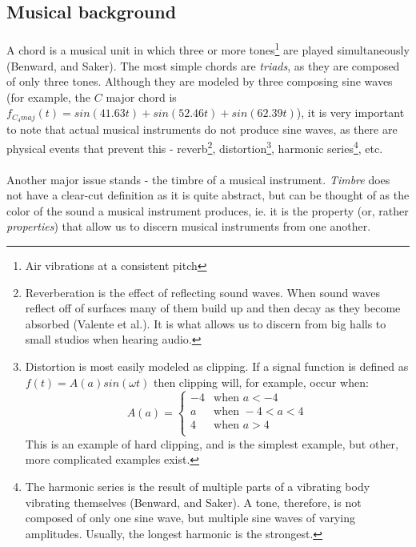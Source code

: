 \documentclass{article}
\begin{document}
\subsection{Musical background}

\paragraph*{}
A chord is a musical unit in which three or more tones\footnote{Air vibrations
at a consistent pitch} are played simultaneously (Benward, and Saker). The most
simple chords are \textit{triads}, as they are composed of only three tones.
Although they are modeled by three composing sine waves (for example, the $C$
major chord is $f_{C_4maj} (t) = sin(41.63t) + sin(52.46t) + sin(62.39t)$), it
is very important to note that actual musical instruments do not produce sine
waves, as there are physical events that prevent this -
reverb\footnote{Reverberation is the effect of reflecting sound waves. When
	sound waves reflect off of surfaces many of them build up and then decay as
	they become absorbed (Valente et al.). It is what allows us to discern from
	big halls to small studios when hearing audio.},
	distortion\footnote{Distortion is most easily modeled as clipping. If a
		signal function is defined as $f(t) = A(a) sin(\omega t)$ then clipping
		will, for example, occur when:
$$A(a) = 
\begin{cases}
	-4	& \text{when }a < -4 \\
	a	& \text{when }-4 < a < 4 \\
	4	& \text{when }a > 4 \\
\end{cases}
$$
This is an example of hard clipping, and is the simplest example, but other, 
more complicated examples exist.}, harmonic series\footnote{The harmonic 
series is the result of multiple parts of a vibrating body vibrating 
themselves (Benward, and Saker). A tone, therefore, is not composed of only 
one sine wave, but multiple sine waves of varying amplitudes. Usually, the 
longest harmonic is the strongest.}, etc.

\paragraph*{}
Another major issue stands - the timbre of a musical instrument. 
\textit{Timbre} does not have a clear-cut definition as it is quite abstract, 
but can be thought of as the color of the sound a musical instrument produces, 
ie. it is the property (or, rather \textit{properties}) that allow us to 
discern musical instruments from one another.
\end{document}
